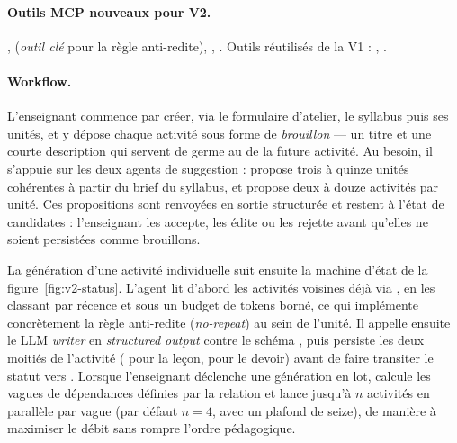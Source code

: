 \paragraph{Outils MCP nouveaux pour V2.}
,
 (\emph{outil clé} pour la règle anti-redite),
,
. Outils réutilisés de la
V1 : , .

\paragraph{Workflow.}
L'enseignant commence par créer, via le formulaire d'atelier, le
syllabus puis ses unités, et y dépose chaque activité sous forme de
\emph{brouillon} — un titre et une courte description qui servent
de germe au  de la future activité. Au
besoin, il s'appuie sur les deux agents de suggestion :
 propose trois à quinze unités
cohérentes à partir du brief du syllabus, et
 propose deux à douze activités
par unité. Ces propositions sont renvoyées en sortie structurée et restent à
l'état de candidates : l'enseignant les accepte, les édite ou les
rejette avant qu'elles ne soient persistées comme brouillons.

La génération d'une activité individuelle suit ensuite la machine
d'état de la figure~\ref{fig:v2-status}. L'agent
 lit d'abord les activités voisines
déjà  via , en les
classant par récence et sous un budget de tokens borné, ce qui
implémente concrètement la règle anti-redite (\emph{no-repeat}) au
sein de l'unité. Il appelle ensuite le \textsc{LLM} \emph{writer} en
\emph{structured output} contre le schéma ,
puis persiste les deux moitiés de l'activité ( pour
la leçon,  pour le devoir) avant de faire
transiter le statut vers . Lorsque l'enseignant
déclenche une génération en lot,
 calcule les vagues de dépendances
définies par la relation  et lance jusqu'à $n$
activités en parallèle par vague (par défaut $n = 4$, avec un plafond
de seize), de manière à maximiser le débit sans rompre l'ordre
pédagogique.

